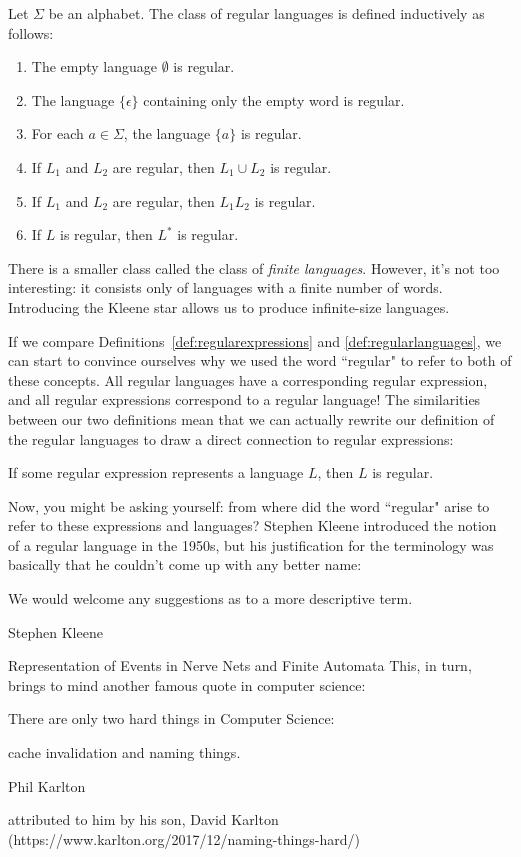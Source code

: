 \begin{definition}\label{def:regularlanguages}
Let $\Sigma$ be an alphabet. The class of regular languages is defined inductively as follows:
\begin{enumerate}
\item The empty language $\emptyset$ is regular.
\item The language $\{\epsilon\}$ containing only the empty word is regular.
\item For each $a \in \Sigma$, the language $\{a\}$ is regular.
\item If $L_{1}$ and $L_{2}$ are regular, then $L_{1} \cup L_{2}$ is regular.
\item If $L_{1}$ and $L_{2}$ are regular, then $L_{1}L_{2}$ is regular.
\item If $L$ is regular, then $L^{*}$ is regular.
\end{enumerate}
\end{definition}

\begin{remark}
There is a smaller class called the class of \emph{finite languages}. However, it's not too interesting: it consists only of languages with a finite number of words. Introducing the Kleene star allows us to produce infinite-size languages.
\end{remark}

If we compare Definitions~\ref{def:regularexpressions} and \ref{def:regularlanguages}, we can start to convince ourselves why we used the word ``regular" to refer to both of these concepts. All regular languages have a corresponding regular expression, and all regular expressions correspond to a regular language! The similarities between our two definitions mean that we can actually rewrite our definition of the regular languages to draw a direct connection to regular expressions:

\begin{customtitlebox}
If some regular expression  represents a language $L$, then $L$ is regular.
\end{customtitlebox}

Now, you might be asking yourself: from where did the word ``regular" arise to refer to these expressions and languages? Stephen Kleene introduced the notion of a regular language in the 1950s, but his justification for the terminology was basically that he couldn't come up with any better name:\par
\epigraph{We would welcome any suggestions as to a more descriptive term.}{Stephen Kleene}{Representation of Events in Nerve Nets and Finite Automata}{}
\vspace{1em}
\noindent
This, in turn, brings to mind another famous quote in computer science:\par
\epigraph{There are only two hard things in Computer Science:\par cache invalidation and naming things.}{Phil Karlton}{attributed to him by his son, David Karlton (https://www.karlton.org/2017/12/naming-things-hard/)}{}

